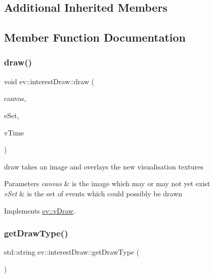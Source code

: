 \subsection*{Additional Inherited Members}


\subsection{Member Function Documentation}
\mbox{\label{classev_1_1interestDraw_aeca2c7248d34d6817e853aad6a254380}} 
\subsubsection{\texorpdfstring{draw()}{draw()}}
{\footnotesize\ttfamily void ev\+::interest\+Draw\+::draw (\begin{DoxyParamCaption}\item[{cv\+::\+Mat \&}]{canvas,  }\item[{const ev\+::v\+Queue \&}]{e\+Set,  }\item[{int}]{v\+Time }\end{DoxyParamCaption})\hspace{0.3cm}{\ttfamily [virtual]}}



draw takes an image and overlays the new visualisation textures 


\begin{DoxyParams}{Parameters}
{\em canvas} & is the image which may or may not yet exist \\
\hline
{\em e\+Set} & is the set of events which could possibly be drawn \\
\hline
\end{DoxyParams}


Implements \hyperlink{classev_1_1vDraw_af1eee5dcdf3b4cfee6a3024e5cd706f8}{ev\+::v\+Draw}.

\mbox{\label{classev_1_1interestDraw_a97dbea009b993f0d8f4b6967b2b241ad}} 
\subsubsection{\texorpdfstring{get\+Draw\+Type()}{getDrawType()}}
{\footnotesize\ttfamily std\+::string ev\+::interest\+Draw\+::get\+Draw\+Type (\begin{DoxyParamCaption}{ }\end{DoxyParamCaption})\hspace{0.3cm}{\ttfamily [virtual]}}



